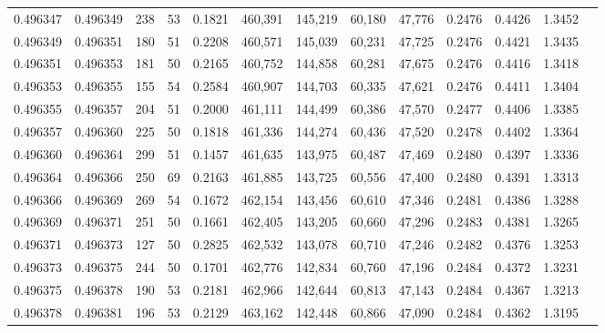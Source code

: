 \begin{tabular}{rrrrrrrrrrrrr}
0.496347 & 0.496349 &   238 &  53 &                                     0.1821 & 460,391 & 145,219 &  60,180 &  47,776 & 0.2476 & 0.4426 & 1.3452 \\
0.496349 & 0.496351 &   180 &  51 &                                     0.2208 & 460,571 & 145,039 &  60,231 &  47,725 & 0.2476 & 0.4421 & 1.3435 \\
0.496351 & 0.496353 &   181 &  50 &                                     0.2165 & 460,752 & 144,858 &  60,281 &  47,675 & 0.2476 & 0.4416 & 1.3418 \\
0.496353 & 0.496355 &   155 &  54 &                                     0.2584 & 460,907 & 144,703 &  60,335 &  47,621 & 0.2476 & 0.4411 & 1.3404 \\
0.496355 & 0.496357 &   204 &  51 &                                     0.2000 & 461,111 & 144,499 &  60,386 &  47,570 & 0.2477 & 0.4406 & 1.3385 \\
0.496357 & 0.496360 &   225 &  50 &                                     0.1818 & 461,336 & 144,274 &  60,436 &  47,520 & 0.2478 & 0.4402 & 1.3364 \\
0.496360 & 0.496364 &   299 &  51 &                                     0.1457 & 461,635 & 143,975 &  60,487 &  47,469 & 0.2480 & 0.4397 & 1.3336 \\
0.496364 & 0.496366 &   250 &  69 &                                     0.2163 & 461,885 & 143,725 &  60,556 &  47,400 & 0.2480 & 0.4391 & 1.3313 \\
0.496366 & 0.496369 &   269 &  54 &                                     0.1672 & 462,154 & 143,456 &  60,610 &  47,346 & 0.2481 & 0.4386 & 1.3288 \\
0.496369 & 0.496371 &   251 &  50 &                                     0.1661 & 462,405 & 143,205 &  60,660 &  47,296 & 0.2483 & 0.4381 & 1.3265 \\
0.496371 & 0.496373 &   127 &  50 &                                     0.2825 & 462,532 & 143,078 &  60,710 &  47,246 & 0.2482 & 0.4376 & 1.3253 \\
0.496373 & 0.496375 &   244 &  50 &                                     0.1701 & 462,776 & 142,834 &  60,760 &  47,196 & 0.2484 & 0.4372 & 1.3231 \\
0.496375 & 0.496378 &   190 &  53 &                                     0.2181 & 462,966 & 142,644 &  60,813 &  47,143 & 0.2484 & 0.4367 & 1.3213 \\
0.496378 & 0.496381 &   196 &  53 &                                     0.2129 & 463,162 & 142,448 &  60,866 &  47,090 & 0.2484 & 0.4362 & 1.3195 \\

\end{tabular}

